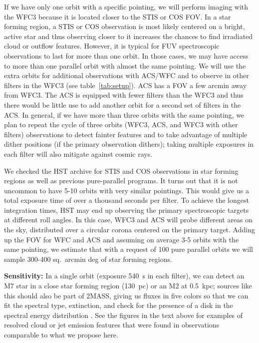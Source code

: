\documentclass[12pt]{article}
\begin{document}
If we have only one orbit with a specific pointing, we will perform imaging with the WFC3 because it is located closer to the STIS or COS FOV. In a star forming region, a STIS or COS observation is most likely centered on a bright, active star and thus observing closer to it increases the chances to find irradiated cloud or outflow features. However,
it is typical for FUV spectroscopic observations to last for more than one orbit. In those cases, we may have access to more than one parallel orbit with almost the same pointing. We will use the extra orbits for additional observations with ACS/WFC and to observe in other filters in the WFC3 (see table~\ref{tab:setup}). ACS has a FOV a few arcmin away from WFC3. The ACS is equipped with fewer filters than the WFC3 and thus there would be little use to add another orbit for a second set of filters in the ACS.
In general, if we have more than three orbits with the same pointing, we plan to repeat the cycle of three orbits (WFC3, ACS, and WFC3 with other filters) observations to detect fainter features and to take advantage of multiple dither positions (if the primary observation dithers); taking multiple exposures in each filter will also mitigate against cosmic rays. 

We checked the HST archive for STIS and COS observations in star forming regions as well as previous pure-parallel programs. It turns out that it is not uncommon to have 5-10 orbits with very similar pointings. This would give us a total exposure time of over a thousand seconds per filter. To achieve the longest integration times, HST may end up observing the primary spectroscopic targets at different roll angles. In this case, WFC3 and ACS will probe different areas on the sky, distributed over a circular corona centered on the primary target. Adding up the FOV for WFC and ACS and assuming on average 3-5 orbits with the same pointing, we estimate that with a request of 100 pure parallel orbits we will sample 300-400 sq.\ arcmin deg of star forming regions.

\textbf{Sensitivity:} In a single orbit (exposure 540~s in each filter), we can detect an M7 star in a close star forming region (130~pc) or an M2 at 0.5~kpc; sources like this should also be part of 2MASS, giving us fluxes in five colors so that we can fit the spectral type, extinction, and check for the presence of a disk in the spectral energy distribution \citep[SED, using models from][]{2007ApJS..169..328R}.
See the figures in the text above for examples of resolved cloud or jet emission features that were found in observations comparable to what we propose here.
\end{document}
